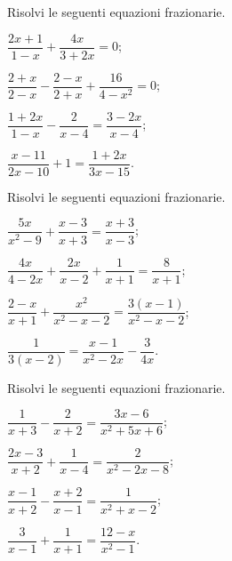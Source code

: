 \begin{esercizio}[\Ast]
\label{ese:17.25}
Risolvi le seguenti equazioni frazionarie.
\begin{multicols}{2}
\begin{enumeratea}
 \item $\dfrac{2x+1}{1-x}+\dfrac{4x}{3+2x}=0$;
 \item $\dfrac{2+x}{2-x}-\dfrac{2-x}{2+x}+\dfrac{16}{4-x^{2}}=0$;
 \item $\dfrac{1+2x}{1-x}-\dfrac{2}{x-4}=\dfrac{3-2x}{x-4}$;
 \item $\dfrac{x-11}{2x-10}+1=\dfrac{1+2x}{3x-15}$.
\end{enumeratea}
\end{multicols}
\end{esercizio}

\begin{esercizio}[\Ast]
\label{ese:17.26}
Risolvi le seguenti equazioni frazionarie.
\begin{multicols}{2}
\begin{enumeratea}
 \item $\dfrac{5x}{x^{2}-9}+\dfrac{x-3}{x+3}=\dfrac{x+3}{x-3}$;
 \item $\dfrac{4x}{4-2x}+\dfrac{2x}{x-2}+\dfrac{1}{x+1}=\dfrac{8}{x+1}$;
 \item $\dfrac{2-x}{x+1}+\dfrac{x^{2}}{x^{2}-x-2}=\dfrac{3(x-1)}{x^{2}-x-2}$;
 \item $\dfrac{1}{3(x-2)}=\dfrac{x-1}{x^{2}-2x}-\dfrac{3}{4x}$.
\end{enumeratea}
\end{multicols}
\end{esercizio}

\begin{esercizio}[\Ast]
\label{ese:17.27}
Risolvi le seguenti equazioni frazionarie.
\begin{multicols}{2}
\begin{enumeratea}
 \item $\dfrac{1}{x+3}-\dfrac{2}{x+2}=\dfrac{3x-6}{x^{2}+5x+6}$;
 \item $\dfrac{2x-3}{x+2}+\dfrac{1}{x-4}=\dfrac{2}{x^{2}-2x-8}$;
 \item $\dfrac{x-1}{x+2}-\dfrac{x+2}{x-1}=\dfrac{1}{x^{2}+x-2}$;
 \item $\dfrac{3}{x-1}+\dfrac{1}{x+1}=\dfrac{12-x}{x^{2}-1}$.
\end{enumeratea}
\end{multicols}
\end{esercizio}

